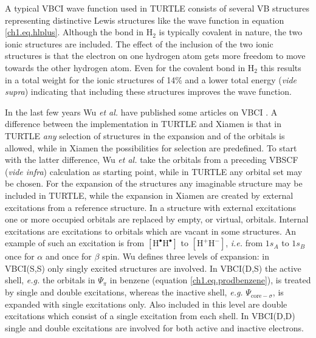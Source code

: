A typical VBCI wave function used in TURTLE consists of several VB structures representing distinctive Lewis structures like the wave function in equation \ref{ch1.eq.hlplus}. Although the bond in H$_2$ is typically covalent in nature, the two ionic structures are included. The effect of the inclusion of the two ionic structures is that the electron on one hydrogen atom gets more freedom to move towards the other hydrogen atom. Even for the covalent bond in H$_2$ this results in a total weight for the ionic structures of 14\% and a lower total energy (\textit{vide supra}) indicating that including these structures improves the wave function.

In the last few years Wu \textit{et al.} have published some articles on VBCI \cite{vbci_wu1,vbci_wu2}. A difference between the implementation in TURTLE and Xiamen \cite{xiamen} is that in TURTLE \textit{any} selection of structures in the expansion and of the orbitals is allowed, while in Xiamen the possibilities for selection are predefined. To start with the latter difference, Wu \textit{et al.} take the orbitals from a preceding VBSCF (\textit{vide infra}) calculation as starting point, while in TURTLE any orbital set may be chosen. For the expansion of the structures any imaginable structure may be included in TURTLE, while the expansion in Xiamen are created by external excitations from a reference structure. In a structure with external excitations one or more occupied orbitals are replaced by empty, or virtual, orbitals. Internal excitations are excitations to orbitals which are vacant in some structures. An example of such an excitation is from $\mathrm{[H^\bullet H^\bullet]}$ to $\mathrm{[H^{+} H^{-}]}$, \textit{i.e.} from $1s_A$ to $1s_B$ once for $\alpha$ and once for $\beta$ spin. Wu defines three levels of expansion: in VBCI(S,S) only singly excited structures are involved. In VBCI(D,S) the active shell, \textit{e.g.} the orbitals in $\Psi_{\pi}$ in benzene (equation \ref{ch1.eq.prodbenzene}), is treated by single and double excitations, whereas the inactive shell, \textit{e.g.} $\Psi_{\mathrm{core}-\sigma}$, is expanded with single excitations only. Also included in this level are double excitations which consist of a single excitation from each shell. In VBCI(D,D) single and double excitations are involved for both active and inactive electrons.

